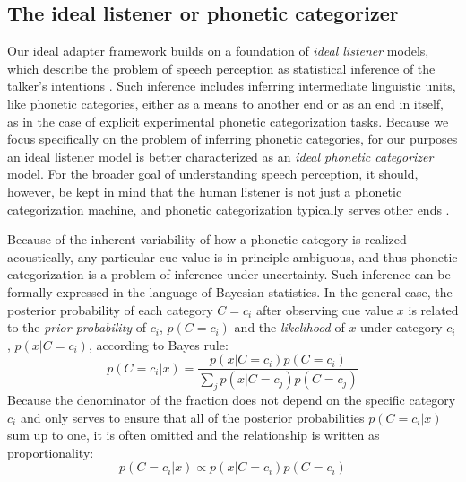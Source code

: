 \subsection{The ideal listener or phonetic categorizer}
\label{sec:ideal-phon-categ}

Our ideal adapter framework builds on a foundation of {\em ideal listener} models, which describe the problem of speech perception as statistical inference of the talker's intentions \autocite{Clayards2008,Feldman2009a,Norris2008,Sonderegger2010}. Such inference includes inferring intermediate linguistic units, like phonetic categories, either as a means to another end or as an end in itself, as in the case of explicit experimental phonetic categorization tasks.  Because we focus specifically on the problem of inferring phonetic categories, for our purposes an ideal listener model is better characterized as an {\em ideal phonetic categorizer} model. For the broader goal of understanding speech perception, it should, however, be kept in mind that the human listener is not just a phonetic categorization machine, and phonetic categorization typically serves other ends \autocites[such as lexical access,][]{Norris2008}[or even the successful inference of communicative intentions][]{Jaeger2013b}.

Because of the inherent variability of how a phonetic category is realized acoustically, any particular cue value is in principle ambiguous, and thus phonetic categorization is a problem of inference under uncertainty.  Such inference can be formally expressed in the language of Bayesian statistics.  In the general case, the posterior probability of each category $C=c_i$ after observing cue value $x$ is related to the \emph{prior probability} of $c_i$,  $p(C=c_i)$ and the \emph{likelihood} of $x$ under category $c_i$, $p(x|C=c_i)$, according to Bayes rule:
\begin{equation*}
  p(C=c_i | x) = \frac{p(x | C=c_i) p(C=c_i)}{\sum_j p(x|C=c_j) p(C=c_j)}  %
\end{equation*}
Because the denominator of the fraction does not depend on the specific category $c_i$ and only serves to ensure that all of the posterior probabilities $p(C=c_i | x)$ sum up to one, it is often omitted and the relationship is written as proportionality:
\begin{equation*}
  p(C=c_i | x) \propto p(x | C=c_i) p(C=c_i)
\end{equation*}

